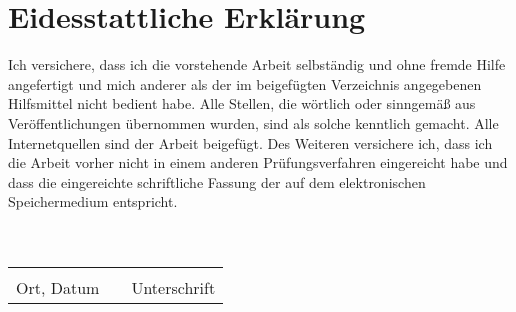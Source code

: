 \documentclass[a4paper, 12pt, oneside]{report}
\begin{document}







\label{Bibliography}

\appendix


\newpage
\thispagestyle{empty}
\section*{Eidesstattliche Erklärung}
Ich versichere, dass ich die vorstehende Arbeit selbständig und ohne fremde Hilfe angefertigt und mich anderer als der im beigefügten Verzeichnis angegebenen Hilfsmittel nicht bedient habe. Alle Stellen, die wörtlich oder sinngemäß aus Veröffentlichungen übernommen wurden, sind als solche kenntlich gemacht. Alle Internetquellen sind der Arbeit beigefügt. Des Weiteren versichere ich, dass ich die Arbeit vorher nicht in einem anderen Prüfungsverfahren eingereicht habe und dass die eingereichte schriftliche Fassung der auf dem elektronischen Speichermedium entspricht.
\\ \\ \\
\begin{tabular}{lp{3em}l}
	\hspace{5cm}   && \hspace{4cm} \\\cline{1-1}\cline{3-3}
	Ort, Datum     && Unterschrift
\end{tabular}
\end{document}

